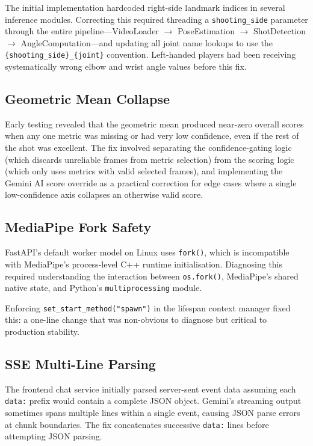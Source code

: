 The initial implementation hardcoded right-side landmark indices in several inference modules. Correcting this required threading a \lstinline|shooting_side| parameter through the entire pipeline---VideoLoader $\rightarrow$ PoseEstimation $\rightarrow$ ShotDetection $\rightarrow$ AngleComputation---and updating all joint name lookups to use the \lstinline|{shooting_side}_{joint}| convention. Left-handed players had been receiving systematically wrong elbow and wrist angle values before this fix.

\subsection{Geometric Mean Collapse}

Early testing revealed that the geometric mean produced near-zero overall scores when any one metric was missing or had very low confidence, even if the rest of the shot was excellent. The fix involved separating the confidence-gating logic (which discards unreliable frames from metric selection) from the scoring logic (which only uses metrics with valid selected frames), and implementing the Gemini AI score override as a practical correction for edge cases where a single low-confidence axis collapses an otherwise valid score.

\subsection{MediaPipe Fork Safety}

FastAPI's default worker model on Linux uses \lstinline|fork()|, which is incompatible with MediaPipe's process-level C++ runtime initialisation. Diagnosing this required understanding the interaction between \lstinline|os.fork()|, MediaPipe's shared native state, and Python's \lstinline|multiprocessing| module. \begin{sloppypar}
Enforcing \lstinline|set_start_method("spawn")| in the lifespan context manager fixed this: a one-line change that was non-obvious to diagnose but critical to production stability.
\end{sloppypar}

\subsection{SSE Multi-Line Parsing}

The frontend chat service initially parsed server-sent event data assuming each \lstinline|data:| prefix would contain a complete JSON object. Gemini's streaming output sometimes spans multiple lines within a single event, causing JSON parse errors at chunk boundaries. The fix concatenates successive \lstinline|data:| lines before attempting JSON parsing.

